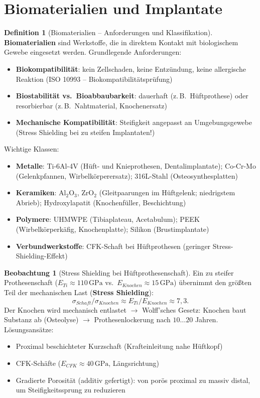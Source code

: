 ﻿\documentclass[a4paper,12pt]{report}
\theoremstyle{definition}
\newtheorem{definition}{Definition}
\newtheorem{beobachtung}{Beobachtung}
\begin{document}
\section{Biomaterialien und Implantate}

\begin{definition}[Biomaterialien -- Anforderungen und Klassifikation]
\textbf{Biomaterialien} sind Werkstoffe, die in direktem Kontakt mit
biologischem Gewebe eingesetzt werden. Grundlegende Anforderungen:
\begin{itemize}
    \item[-] \textbf{Biokompatibilität}: kein Zellschaden, keine Entzündung,
          keine allergische Reaktion (ISO 10993 -- Biokompatibilitätsprüfung)
    \item[-] \textbf{Biostabilität vs.\ Bioabbaubarkeit}: dauerhaft
          (z.\,B.\ Hüftprothese) oder resorbierbar (z.\,B.\ Nahtmaterial, Knochenersatz)
    \item[-] \textbf{Mechanische Kompatibilität}: Steifigkeit angepasst an
          Umgebungsgewebe (Stress Shielding bei zu steifen Implantaten!)
\end{itemize}
Wichtige Klassen:
\begin{itemize}
    \item[-] \textbf{Metalle}: Ti-6Al-4V (Hüft- und Knieprothesen, Dentalimplantate);
          Co-Cr-Mo (Gelenkpfannen, Wirbelkörperersatz); 316L-Stahl (Osteosynthesplatten)
    \item[-] \textbf{Keramiken}: $\mathrm{Al_2O_3}$, ZrO$_2$ (Gleitpaarungen im Hüftgelenk;
          niedrigstem Abrieb); Hydroxylapatit (Knochenfüller, Beschichtung)
    \item[-] \textbf{Polymere}: UHMWPE (Tibiaplateau, Acetabulum);
          PEEK (Wirbelkörperkäfig, Knochenplatte); Silikon (Brustimplantate)
    \item[-] \textbf{Verbundwerkstoffe}: CFK-Schaft bei Hüftprothesen
          (geringer Stress-Shielding-Effekt)
\end{itemize}
\end{definition}

\begin{beobachtung}[Stress Shielding bei Hüftprothesenschaft]
Ein zu steifer Prothesenschaft ($E_{Ti} \approx 110\,\mathrm{GPa}$
vs.\ $E_{Knochen} \approx 15\,\mathrm{GPa}$) übernimmt den größten Teil
der mechanischen Last (\textbf{Stress Shielding}):
\[
  \sigma_{Schaft}/\sigma_{Knochen} \approx E_{Ti}/E_{Knochen} \approx 7{,}3.
\]
Der Knochen wird mechanisch entlastet $\to$ Wolff'sches Gesetz:
Knochen baut Substanz ab (Osteolyse) $\to$ Prothesenlockerung nach $10\ldots20$ Jahren.
Lösungsansätze:
\begin{itemize}
    \item[-] Proximal beschichteter Kurzschaft (Krafteinleitung nahe Hüftkopf)
    \item[-] CFK-Schäfte ($E_{CFK} \approx 40\,\mathrm{GPa}$, Längsrichtung)
    \item[-] Gradierte Porosität (additiv gefertigt): von porös proximal
          zu massiv distal, um Steifigkeitssprung zu reduzieren
\end{itemize}
\end{beobachtung}
\end{document}
